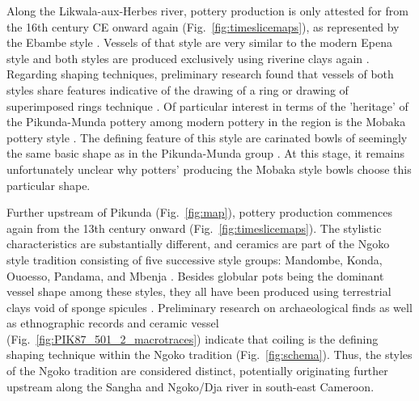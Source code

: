 \documentclass[smallextended,natbib]{svjour3}       %
\begin{document}
Along the Likwala-aux-Herbes river, pottery production is only attested for from the 16th century CE onward again (Fig.~\ref{fig:timeslicemaps}), as represented by the Ebambe style \citep[Fig.~\ref{fig:sangahtypes}.22-23;][131--136]{Seidensticker.2021e}. Vessels of that style are very similar to the modern Epena style \citep[Fig.~\ref{fig:sangahtypes}.25-26][137--141]{Seidensticker.2021e} and both styles are produced exclusively using riverine clays again \citep{Seidensticker.2020}. Regarding shaping techniques, preliminary research found that vessels of both styles share features indicative of the drawing of a ring or drawing of superimposed rings technique \citep[Fig.~\ref{fig:schema};][55--57 Fig.~17--18]{Seidensticker.2021e}. Of particular interest in terms of the 'heritage' of the Pikunda-Munda pottery among modern pottery in the region is the Mobaka pottery style \citep[141--144]{Seidensticker.2021e}. The defining feature of this style are carinated bowls of seemingly the same basic shape as in the Pikunda-Munda group \citep[Fig.~\ref{fig:sangahtypes}.24;][142 Fig.~63.1,64]{Seidensticker.2021e}. At this stage, it remains unfortunately unclear why potters' producing the Mobaka style bowls choose this particular shape.

Further upstream of Pikunda (Fig.~\ref{fig:map}), pottery production commences again from the 13th century onward (Fig.~\ref{fig:timeslicemaps}). The stylistic characteristics are substantially different, and ceramics are part of the Ngoko style tradition consisting of five successive style groups: Mandombe, Konda, Ouoesso, Pandama, and Mbenja \citep[Fig.~\ref{fig:sangahtypes}.13--21;][145--162]{Seidensticker.2021e}. Besides globular pots being the dominant vessel shape among these styles, they all have been produced using terrestrial clays void of sponge spicules \citep[Fig.~\ref{fig:thinsections}.J--K;][]{Seidensticker.2020}. Preliminary research on archaeological finds \citep[Fig.~\ref{fig:PIK87_1-2_3_macrotraces}--\ref{fig:PIK87_1_macrotraces};][53--54 Fig.~16B]{Seidensticker.2021e} as well as ethnographic records and ceramic vessel (Fig.~\ref{fig:PIK87_501_2_macrotraces}) indicate that coiling is the defining shaping technique within the Ngoko tradition (Fig.~\ref{fig:schema}). Thus, the styles of the Ngoko tradition are considered distinct, potentially originating further upstream along the Sangha and Ngoko/Dja river in south-east Cameroon. 

\end{document}
